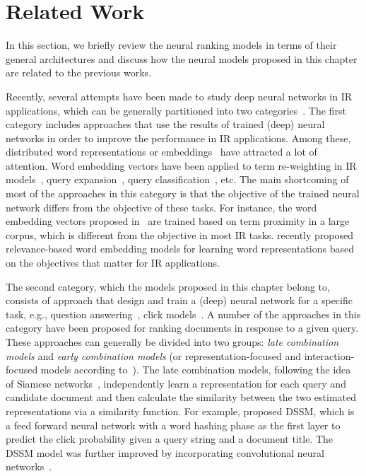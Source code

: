 \section{Related Work}
In this section, we briefly review the neural ranking models in terms of their general architectures and discuss how the neural models proposed in this chapter are related to the previous works.

Recently, several attempts have been made to study deep neural networks in IR applications, which can be generally partitioned into two categories~\citep{guo2019deep, Onal:2016, Zhang:2016}. 
The first category includes approaches that use the results of trained (deep) neural networks in order to improve the performance in IR applications. Among these, distributed word representations or embeddings~\citep{Mikolov:2013,Pennington:2014} have attracted a lot of attention. Word embedding vectors have been applied to term re-weighting in IR models~\citep{Zheng:2015}, query expansion~\citep{Diaz:2016,Zamani:2016a}, query classification~\citep{Liu:2015,Zamani:2016b},  etc. 
The main shortcoming of most of the approaches in this category is that the objective of the trained neural network differs from the objective of these tasks.  For instance, the word embedding vectors proposed in~\citep{Mikolov:2013,Pennington:2014} are trained based on term proximity in a large corpus, which is different from the objective in most IR tasks. \citet{Zamani:2017} recently proposed relevance-based word embedding models for learning word representations based on the objectives that matter for IR applications.

The second category, which the models proposed in this chapter belong to, consists of approach that design and train a (deep) neural network for a specific task, e.g., question answering~\citep{Cohen:2016,Yang:2016}, click models~\citep{Borisov:2016}.
A number of the approaches in this category have been proposed for ranking documents in response to a given query.
These approaches can generally be divided into two groups: \emph{late combination models} and \emph{early combination models} (or representation-focused and interaction-focused models according to~\citep{Guo:2016}). 
The late combination models, following the idea of Siamese networks~\citep{Bromley:1993}, independently learn a representation for each query and candidate document and then calculate the similarity between the two estimated representations via a similarity function. For example, \citet{Huang:2013} proposed DSSM, which is a feed forward neural network with a word hashing phase as the first layer to predict the click probability given a query string and a document title. 
The DSSM model was further improved by incorporating convolutional neural networks~\citep{Shen:2014}.

